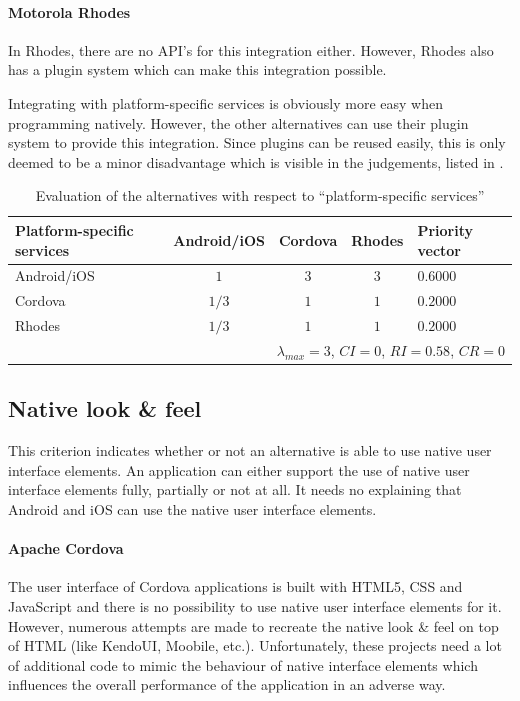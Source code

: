 \paragraph{Motorola Rhodes} In Rhodes, there are no API's for this integration either. However, Rhodes also has a plugin system which can make this integration possible. 

Integrating with platform-specific services is obviously more easy when programming natively. However, the other alternatives can use their plugin system to provide this integration. Since plugins can be reused easily, this is only deemed to be a minor disadvantage which is visible in the judgements, listed in . 

\begin{table}[h!]
    \centering
    \begin{tabular}{lcccl}
        \hline
        \textbf{Platform-specific services} & Android/iOS & Cordova & Rhodes & Priority vector \\
        \hline
        Android/iOS                         & $1$         & $3$     & $3$   & $0.6000$         \\
        Cordova                             & $1/3$       & $1$     & $1$   & $0.2000$         \\
        Rhodes                              & $1/3$       & $1$     & $1$   & $0.2000$         \\
        \hline
        \multicolumn{5}{r}{$\lambda_{max} = 3$, $CI = 0$, $RI = 0.58$, $CR = 0$}               \\
        \hline
    \end{tabular}
    \caption{Evaluation of the alternatives with respect to ``platform-specific services''}
    \label{tab:pss}
\end{table}

\subsection{Native look \& feel}

This criterion indicates whether or not an alternative is able to use native user interface elements. An application can either support the use of native user interface elements fully, partially or not at all. It needs no explaining that Android and iOS can use the native user interface elements.

\paragraph{Apache Cordova} The user interface of Cordova applications is built with HTML5, CSS and JavaScript and there is no possibility to use native user interface elements for it. However, numerous attempts are made to recreate the native look \& feel on top of HTML (like KendoUI, Moobile, etc.). Unfortunately, these projects need a lot of additional code to mimic the behaviour of native interface elements which influences the overall performance of the application in an adverse way.

